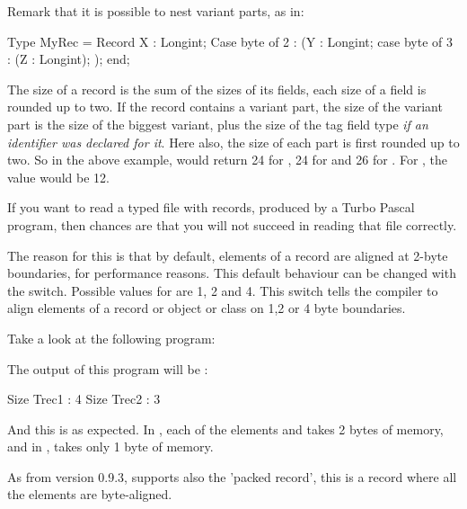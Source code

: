 \documentclass{report}
\begin{document}
Remark that it is possible to  nest variant parts, as in:
\begin{listing}
Type
  MyRec = Record
          X : Longint;
          Case byte of
            2 : (Y : Longint;
                 case byte of
                 3 : (Z : Longint);
                 );
          end;     
\end{listing}

The size of a record is the sum of the sizes of its fields, each size of a
field is rounded up to two. If the record contains a variant part, the size
of the variant part is the size of the biggest variant, plus the size of the
tag field type {\em if an identifier was declared for it}. Here also, the size of 
each part is first rounded up to two. So in the above example, 
 would return 24 for , 24 for  and 
26 for . For , the value would be 12.

If you want to read a typed file with records, produced by
a Turbo Pascal program, then chances are that you will not succeed in
reading that file correctly.

The reason for this is that by default, elements of a record are aligned at
2-byte boundaries, for performance reasons. This default behaviour can be
changed with the  switch. Possible values for
 are 1, 2 and 4. This switch tells the compiler to align elements of
a record or object or class on 1,2 or 4 byte boundaries. 

Take a look at the following program:
The output of this program will be :
\begin{listing}
Size Trec1 : 4
Size Trec2 : 3
\end{listing}
And this is as expected. In , each of the elements  and
 takes 2 bytes of memory, and in  ,  takes only 1
byte of memory.

As from version 0.9.3, \fpc supports also the 'packed record', this is a 
record where all the elements are byte-aligned.
\end{document}
